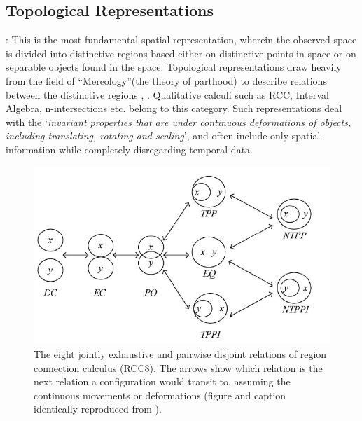 		
		
		\subsection{Topological Representations} : This is the most fundamental spatial representation\cite{cohn1997qualitative}, \cite{chen2015survey} wherein the observed space is divided into distinctive regions based either on distinctive points in space or on separable objects found in the space. Topological representations draw heavily from the field of ``Mereology''(the theory of parthood) to describe relations between the distinctive regions \cite{cohn2001qualitative}, \cite{cohn2008qualitative}. Qualitative calculi such as RCC, Interval Algebra, n-intersections etc. belong to this category. Such representations deal with the `\textit{invariant properties that are under continuous deformations of objects, including translating, rotating and scaling}', and often include only spatial information while completely disregarding temporal data. 
		
		\begin{figure}[h]
			\centering
			\includegraphics[width=0.7\linewidth]{images/rcc8_rel}
			\caption{The eight jointly exhaustive and pairwise disjoint relations of region connection calculus (RCC8). The arrows show which relation is the next relation a configuration would transit to, assuming the continuous movements or deformations (figure and caption identically reproduced from \cite{chen2015survey}).}
			\label{fig:rcc8rel}
		\end{figure}
		
		
